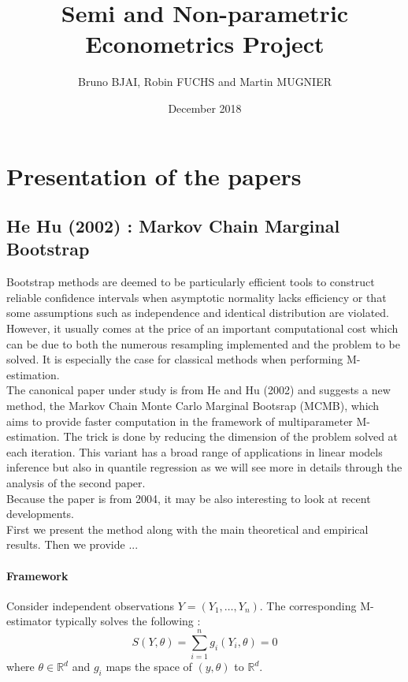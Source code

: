\documentclass[11pt]{article}
\title{Semi and Non-parametric Econometrics Project}
\author{Bruno BJAI, Robin FUCHS and Martin MUGNIER}
\date{December 2018}
\begin{document}
\maketitle



\section{Presentation of the papers}

\subsection{He Hu (2002) : Markov Chain Marginal Bootstrap}

Bootstrap methods are deemed to be particularly efficient tools to construct reliable confidence intervals when asymptotic normality lacks efficiency or that some assumptions such as independence and identical distribution are violated. However, it usually comes at the price of an important computational cost which can be due to both the numerous resampling implemented and the problem to be solved. It is especially the case for classical methods when performing M-estimation.  \\

The canonical paper under study is from He and Hu (2002) and suggests a new method, the Markov Chain Monte Carlo Marginal Bootsrap (MCMB), which aims to provide faster computation in the framework of multiparameter M-estimation. The trick is done by reducing the dimension of the problem solved at each iteration. This variant has a broad range of applications in linear models inference but also in quantile regression as we will see more in details through the analysis of the second paper. \\

Because the paper is from 2004, it may be also interesting to look at recent developments. \\

First we present the method along with the main theoretical and empirical results. Then we provide ...


\paragraph{Framework}
Consider independent observations $Y = (Y_1, \dots, Y_n)$. The corresponding M-estimator typically solves the following : 
\begin{equation}
\label{eqpb}
S(Y, \theta) = \sum_{i=1}^n g_i(Y_i,\theta) = 0
\end{equation}
where $\theta \in \mathbb{R}^d$ and $g_i$ maps the space of $(y,\theta)$ to $\mathbb{R}^d$. \\
\end{document}
